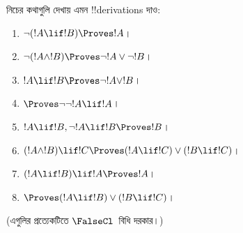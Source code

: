 \documentclass[../../../include/open-logic-section]{subfiles}
\begin{document}
\begin{prob}
নিচের কথাগুলি দেখায় এমন !!{derivation}s দাও:
\begin{enumerate}
\item $\lnot(!A \lif !B) \Proves !A$।
\item $\lnot(!A \land !B) \Proves \lnot !A \lor \lnot !B$।
\item $!A \lif !B \Proves \lnot !A \lor !B$।
\item $\Proves \lnot \lnot !A \lif !A$।
\item $!A \lif !B, \lnot !A \lif !B \Proves !B$।
\item $(!A \land !B) \lif !C \Proves (!A \lif !C) \lor (!B \lif !C)$।
\item $(!A \lif !B) \lif !A \Proves !A$।
\item $\Proves (!A \lif !B) \lor (!B \lif !C)$।
\end{enumerate}
(এগুলির প্রত্যেকটিতে $\FalseCl$~বিধি দরকার।)
\end{prob}
\end{document}
